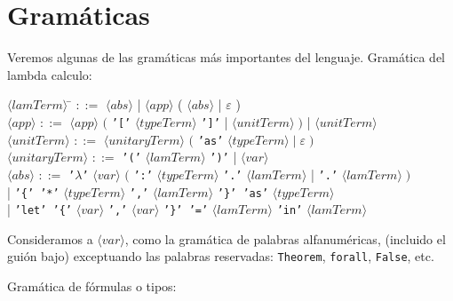 \documentclass[a4paper,11pt]{article}
\theoremstyle{definition}
\begin{document}
\section{Gramáticas}

Veremos algunas de las gramáticas más importantes del lenguaje.
Gramática del lambda calculo:

\begin{tabbing}
$\langle lamTerm \rangle$ \hspace{0.5cm} \= $::=$ $\langle abs \rangle$ | $\langle app \rangle$ 
\Big( $\langle abs \rangle$ | $\varepsilon$ \Big) \\

$\langle app \rangle$ \> $::=$ $\langle app \rangle$ $\Big($ \texttt{'['} $\langle typeTerm \rangle$ \texttt{']'} 
| $\langle unitTerm \rangle \; \Big)$ 
| $\langle unitTerm \rangle$ \\

$\langle unitTerm \rangle$ \> $::=$ $\langle unitaryTerm \rangle$ $\Big($ \texttt{'as'} $\langle typeTerm \rangle \; 
| \; \varepsilon \; \Big)$ \\

$\langle unitaryTerm \rangle$ \> $::=$ \texttt{'('} $\langle lamTerm \rangle$ \texttt{')'} 
| $\langle var \rangle$ \\

$\langle abs \rangle$ \> $::=$ \texttt{'$\lambda$'} $\langle var \rangle$ $\Big($ \texttt{':'} $\langle typeTerm \rangle$ \texttt{'.'} 
$\langle lamTerm \rangle$ | \texttt{'.'} $\langle lamTerm \rangle \; \Big)$ \\
\> | \texttt{'\{' '*'} $\langle typeTerm \rangle$ \texttt{','} $\langle lamTerm \rangle$ \texttt{'\}' 'as'} $\langle typeTerm \rangle$ \\
\> | \texttt{'let' '\{'} $\langle var \rangle$ \texttt{','} $\langle var \rangle$ \texttt{'\}' '='} $\langle lamTerm \rangle$ \texttt{'in'}
$\langle lamTerm \rangle$

\end{tabbing}

Consideramos a $\langle var \rangle$, como la gramática de palabras alfanuméricas, (incluido el guión bajo) 
exceptuando las palabras reservadas: \texttt{Theorem}, \texttt{forall}, \texttt{False}, etc.

Gramática de fórmulas o tipos:
\end{document}
